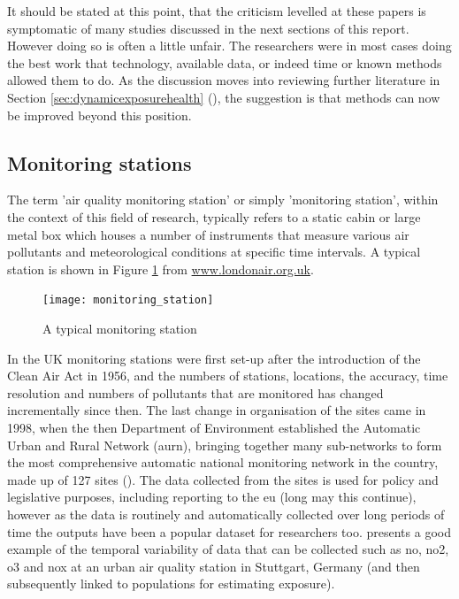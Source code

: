 It should be stated at this point, that the criticism levelled at these papers is symptomatic of many studies discussed in the next sections of this report. However doing so is often a little unfair. The researchers were in most cases doing the best work that technology, available data, or indeed time or known methods allowed them to do. As the discussion moves into reviewing further literature in Section \ref{sec:dynamicexposurehealth} (), the suggestion is that methods can now be improved beyond this position.


\subsection{Monitoring stations}
\label{subsec:monitoringstation}

The term 'air quality monitoring station' or simply 'monitoring station', within the context of this field of research, typically refers to a static cabin or large metal box which houses a number of instruments that measure various air pollutants and meteorological conditions at specific time intervals. A typical station is shown in Figure \ref{fig:monitoring_station} from \url{www.londonair.org.uk}.

\begin{figure}[H]
\centering
\texttt{[image: monitoring\_station]}
\caption{A typical monitoring station}
\label{fig:monitoring_station}
\end{figure}

In the UK monitoring stations were first set-up after the introduction of the Clean Air Act in 1956, and the numbers of stations, locations, the accuracy, time resolution and numbers of pollutants that are monitored has changed incrementally since then. The last change in organisation of the sites came in 1998, when the then Department of Environment established the Automatic Urban and Rural Network (\gls{aurn}), bringing together many sub-networks to form the most comprehensive automatic national monitoring network in the country, made up of 127 sites (\cite{DEFRA2011a}). The data collected from the sites is used for policy and legislative purposes, including reporting to the \gls{eu} (long may this continue), however as the data is routinely and automatically collected over long periods of time the outputs have been a popular dataset for researchers too. \cite{Mayer1999} presents a good example of the temporal variability of data that can be collected such as \gls{no}, \gls{no2}, \gls{o3} and \gls{nox} at an urban air quality station in Stuttgart, Germany (and then subsequently linked to populations for estimating exposure).

